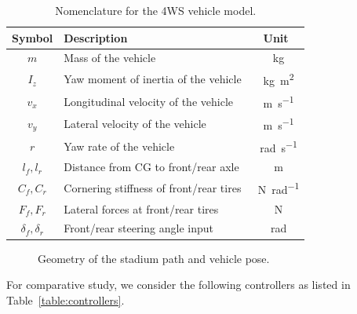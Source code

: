 \documentclass[letterpaper, journal]{IEEEtran}
\newcommand*{\Ff}{F_f}
\newcommand*{\Fr}{F_r}
\newcommand*{\delf}{\delta_f}
\newcommand*{\delr}{\delta_r}
\newcommand*{\lf}{l_f}
\newcommand*{\lr}{l_r}
\newcommand*{\Cf}{C_f}
\newcommand*{\Cr}{C_r}
\begin{document}
\begin{table}[!t]
  \renewcommand{\arraystretch}{1.3}
  \centering
  \begin{tabular}{c l c} 
  \hline
  \textbf{Symbol} & \textbf{Description} & \textbf{Unit} \\
  \hline
  \hline 
  $m$ & Mass of the vehicle & \qty{}{\kilo\gram} \\
  \hline
  $I_z$  & Yaw moment of inertia of the vehicle & \qty{}{\kilo\gram\meter\squared} \\  
  \hline
  $v_x$ & Longitudinal velocity of the vehicle & \qty{}{\meter\per\second} \\
  \hline
  $v_y$ & Lateral velocity of the vehicle & \qty{}{\meter\per\second} \\
  \hline
  $r$ & Yaw rate of the vehicle & \qty{}{\radian\per\second} \\
  \hline
  $\lf,\lr$ & Distance from CG to front/rear axle & \qty{}{\meter} \\
  \hline
  $\Cf,\Cr$ & Cornering stiffness of front/rear tires & \qty{}{\newton\per\radian} \\
  \hline
  $\Ff,\Fr$ & Lateral forces at front/rear tires & \qty{}{\newton} \\
  \hline
  $\delf,\delr$ & Front/rear steering angle input & \qty{}{\radian} \\
  \hline
  \end{tabular}
  \caption{Nomenclature for the 4WS vehicle model.}
  \label{table:sys:nomenclature}
\end{table}

\begin{figure}[!t]
    \centering
    \caption{
      Geometry of the stadium path and vehicle pose.
    }
    \label{fig:stadium-geometry}
\end{figure}

\hfill

For comparative study, we consider the following  controllers as listed in Table~\ref{table:controllers}.


\hfill
\end{document}
